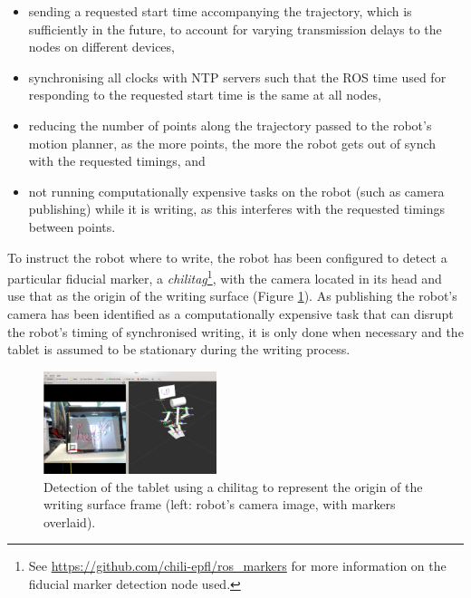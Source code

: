 \documentclass{sig-alternate}
\begin{document}
\begin{itemize}

    \item sending a requested start time accompanying the trajectory, which is
        sufficiently in the future, to account for varying transmission delays
        to the nodes on different devices,

    \item synchronising all clocks with NTP servers such that the ROS time used
        for responding to the requested start time is the same at all nodes,

    \item reducing the number of points along the trajectory passed to the
        robot's motion planner, as the more points, the more the robot gets out
        of synch with the requested timings, and

    \item not running computationally expensive tasks on the robot (such as
        camera publishing) while it is writing, as this interferes with the
        requested timings between points. 

\end{itemize}


To instruct the robot where to write, the robot has been configured to detect a
particular fiducial marker, a \emph{chilitag}\footnote{See
\url{https://github.com/chili-epfl/ros_markers} for more information on the
fiducial marker detection node used.}, with the camera located in its head and
use that as the origin of the writing surface (Figure
\ref{fig:tabletDetection}). As publishing the robot's camera has been identified
as a computationally expensive task that can disrupt the robot's timing of
synchronised writing, it is only done when necessary and the tablet is assumed
to be stationary during the writing process.

\begin{figure}[htpb]
    \centering
    \includegraphics[width=0.45\textwidth]{figures/chilitagDetection_cameraOverlay.png}
    \caption[Detection of the tablet using a chilitag to represent the origin of
    the writing surface frame.]{\label{fig:tabletDetection}Detection of the
    tablet using a chilitag to represent the origin of the writing surface frame
(left: robot's camera image, with markers overlaid).}

\end{figure}
\end{document}
